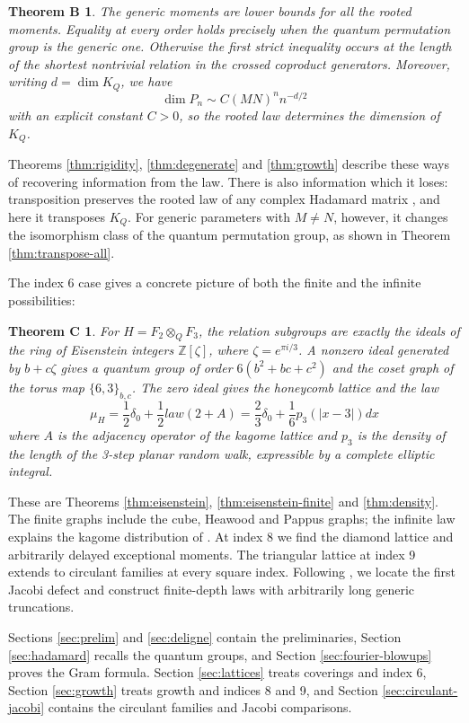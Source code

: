 \documentclass[11pt,reqno]{amsart}
\newtheorem*{thmB}{Theorem B}
\newtheorem*{thmC}{Theorem C}
\theoremstyle{definition}
\numberwithin{equation}{section}
\begin{document}
\begin{thmB}
The generic moments are lower bounds for all the rooted moments. Equality at every order holds precisely when the quantum permutation group is the generic one. Otherwise the first strict inequality occurs at the length of the shortest nontrivial relation in the crossed coproduct generators. Moreover, writing $d=\dim K_Q$, we have
$$\dim P_n\sim C(MN)^nn^{-d/2}$$
with an explicit constant $C>0$, so the rooted law determines the dimension of $K_Q$.
\end{thmB}

Theorems \ref{thm:rigidity}, \ref{thm:degenerate} and \ref{thm:growth} describe these ways of recovering information from the law. There is also information which it loses: transposition preserves the rooted law of any complex Hadamard matrix \cite{BO26}, and here it transposes $K_Q$. For generic parameters with $M\neq N$, however, it changes the isomorphism class of the quantum permutation group, as shown in Theorem \ref{thm:transpose-all}.

The index 6 case gives a concrete picture of both the finite and the infinite possibilities:

\begin{thmC}
For $H=F_2\otimes_QF_3$, the relation subgroups are exactly the ideals of the ring of Eisenstein integers $\mathbb Z[\zeta]$, where $\zeta=e^{\pi i/3}$. A nonzero ideal generated by $b+c\zeta$ gives a quantum group of order $6(b^2+bc+c^2)$ and the coset graph of the torus map $\{6,3\}_{b,c}$. The zero ideal gives the honeycomb lattice and the law
$$\mu_H=\frac12\delta_0+\frac12 law(2+A)=\frac23\delta_0+\frac16p_3(|x-3|)dx$$
where $A$ is the adjacency operator of the kagome lattice and $p_3$ is the density of the length of the 3-step planar random walk, expressible by a complete elliptic integral.
\end{thmC}

These are Theorems \ref{thm:eisenstein}, \ref{thm:eisenstein-finite} and \ref{thm:density}. The finite graphs include the cube, Heawood and Pappus graphs; the infinite law explains the kagome distribution of \cite{ABF26}. At index 8 we find the diamond lattice and arbitrarily delayed exceptional moments. The triangular lattice at index 9 extends to circulant families at every square index. Following \cite{BP26}, we locate the first Jacobi defect and construct finite-depth laws with arbitrarily long generic truncations.

Sections \ref{sec:prelim} and \ref{sec:deligne} contain the preliminaries, Section \ref{sec:hadamard} recalls the quantum groups, and Section \ref{sec:fourier-blowups} proves the Gram formula. Section \ref{sec:lattices} treats coverings and index 6, Section \ref{sec:growth} treats growth and indices 8 and 9, and Section \ref{sec:circulant-jacobi} contains the circulant families and Jacobi comparisons.
\end{document}
